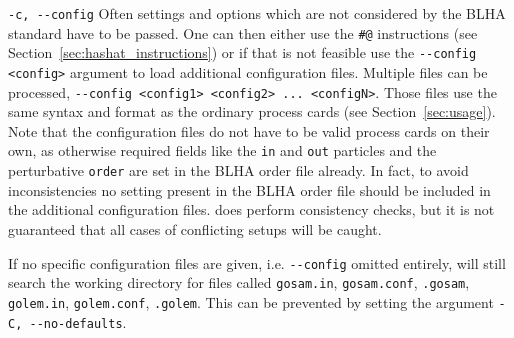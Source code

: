 \begin{basedescript}{\desclabelstyle{\pushlabel}}
      \item[\hspace{-1em}]\colorbox{gray!30}{\lstinline[style=sh]|-c, --config|} Often settings and options which are not considered by the BLHA standard have to be passed. One can then either use the \texttt{\#@} instructions (see Section~\ref{sec:hashat_instructions}) or if that is not feasible use the \lstinline[style=sh]|--config <config>| argument to load additional configuration files. Multiple files can be processed, \lstinline[style=sh]|--config <config1> <config2> ... <configN>|. Those files use the same syntax and format as the ordinary process cards (see Section~\ref{sec:usage}). Note that the configuration files do not have to be valid process cards on their own, as otherwise required fields like the \texttt{in} and \texttt{out} particles and the perturbative \texttt{order} are set in the BLHA order file already. In fact, to avoid inconsistencies no setting present in the BLHA order file should be included in the additional configuration files. \gosam does perform consistency checks, but it is not guaranteed that all cases of conflicting setups will be caught.

      If no specific configuration files are given, i.e. \lstinline[style=sh]|--config| omitted entirely, \gosam will still search the working directory for files called \texttt{gosam.in}, \texttt{gosam.conf}, \texttt{.gosam}, \texttt{golem.in}, \texttt{golem.conf}, \texttt{.golem}. This can be prevented by setting the argument \colorbox{gray!30}{\lstinline[style=sh]|-C, --no-defaults|}.


\end{basedescript}
